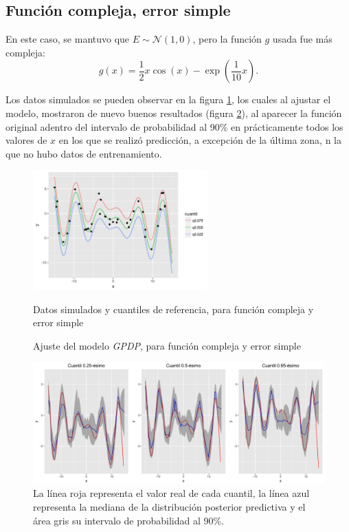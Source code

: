 \subsection{Funci\'on compleja, error simple}

En este caso, se mantuvo que $E \sim \mathcal{N}(1,0)$, pero la funci\'on $g$ usada fue m\'as compleja:
\begin{equation*}
    g(x) = \frac{1}{2} x \cos(x) - \exp\left(\frac{1}{10}x\right).
\end{equation*}

Los datos simulados se pueden observar en la figura \ref{sample_cgse}, los cuales al ajustar el modelo, mostraron de nuevo buenos resultados (figura \ref{fitted_cgse}), al aparecer la funci\'on original adentro del intervalo de probabilidad al 90\% en pr\'acticamente todos los valores de $x$ en los que se realiz\'o predicci\'on, a excepci\'on de la \'ultima zona, n la que no hubo datos de entrenamiento.

\begin{figure}[H]
	\centering
	\caption{Datos simulados y cuantiles de referencia, para funci\'on compleja y error simple}
	\includegraphics[width=0.60\textwidth]{Figures/Simulation/complex_g_simple_error/sample.png}
	\label{sample_cgse}
\end{figure}

\begin{figure}[H]
	\centering
	\caption{Ajuste del modelo \textit{GPDP}, para funci\'on compleja y error simple}
	\includegraphics[width=\textwidth]{Figures/Simulation/complex_g_simple_error/fitted_models.png}
	\captionsetup{singlelinecheck=off, font=footnotesize}
    \caption*{La l\'inea roja representa el valor real de cada cuantil, la l\'inea azul representa la mediana de la distribuci\'on posterior predictiva y el \'area gris su intervalo de probabilidad al 90\%.}
	\label{fitted_cgse}
\end{figure}

